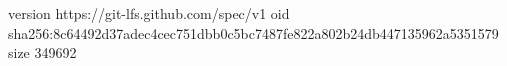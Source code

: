 version https://git-lfs.github.com/spec/v1
oid sha256:8c64492d37adec4cec751dbb0c5bc7487fe822a802b24db447135962a5351579
size 349692
